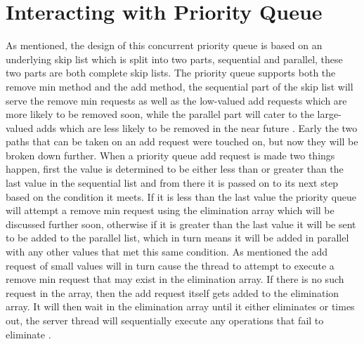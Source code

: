 \documentclass[10pt]{asme2ej}
\begin{document}
\section{Interacting with Priority Queue}	
As mentioned, the design of this concurrent priority queue is based on an underlying skip list which is split into two parts, sequential and parallel, these two parts are both complete skip lists. The priority queue supports both the remove min method and the add method, the sequential part of the skip list will serve the remove min requests as well as the low-valued add requests which are more likely to be removed soon, while the parallel part will cater to the large-valued adds which are less likely to be removed in the near future \cite{latex}. Early the two paths that can be taken on an add request were touched on, but now they will be broken down further. When a priority queue add request is made two things happen, first the value is determined to be either less than or greater than the last value in the sequential list and from there it is passed on to its next step based on the condition it meets. If it is less than the last value the priority queue will attempt a remove min request using the elimination array which will be discussed further soon, otherwise if it is greater than the last value it will be sent to be added to the parallel list, which in turn means it will be added in parallel with any other values that met this same condition. As mentioned the add request of small values will in turn cause the thread to attempt to execute a remove min request that may exist in the elimination array. If there is no such request in the array, then the add request itself gets added to the elimination array. It will then wait in the elimination array until it either eliminates or times out, the server thread will sequentially execute any operations that fail to eliminate \cite{latex}.
\end{document}
